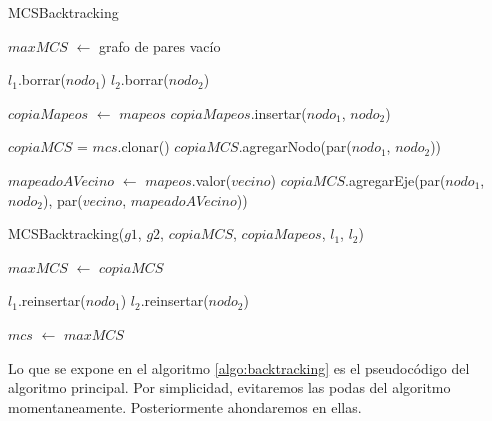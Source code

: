 \begin{algorithm}[H]
    \caption{MCSBacktracking}
    \label{algo:backtracking}


     {
    }

    $maxMCS$ $\gets$ grafo de pares vacío \;

     {
         {

            $l_1$.borrar($nodo_1$) \;
            $l_2$.borrar($nodo_2$) \;

            $copiaMapeos$ $\gets$ $mapeos$ \;
            $copiaMapeos$.insertar($nodo_1$, $nodo_2$) \;

            $copiaMCS$ = $mcs$.clonar() \;
            $copiaMCS$.agregarNodo(par($nodo_1$, $nodo_2$)) \;

             {
                $mapeadoAVecino$ $\gets$ $mapeos$.valor($vecino$) \;
                 {
                    $copiaMCS$.agregarEje(par($nodo_1$, $nodo_2$), par($vecino$,
                    $mapeadoAVecino$))
                }
            }

            MCSBacktracking($g1$, $g2$, $copiaMCS$, $copiaMapeos$, $l_1$, $l_2$) \;

             {
                $maxMCS$ $\gets$ $copiaMCS$ \;
            }

            $l_1$.reinsertar($nodo_1$) \;
            $l_2$.reinsertar($nodo_2$) \;
        }
    }

    $mcs$ $\gets$ $maxMCS$

\end{algorithm}

Lo que se expone en el algoritmo \ref{algo:backtracking} es el pseudocódigo
del algoritmo principal. Por simplicidad, evitaremos las podas del algoritmo
momentaneamente. Posteriormente ahondaremos en ellas.

